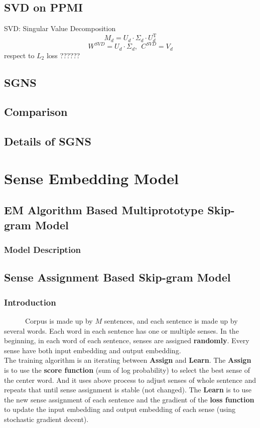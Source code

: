 \documentclass[12pt,a4paper,twoside]{book}
\begin{document}
\subsection{SVD on PPMI} 
SVD: Singular Value Decomposition \\
$$M_d = U_d\cdot\Sigma_d\cdot U_d^{\mathrm{T}}$$
$$W^{SVD} = U_d\cdot\Sigma_d, \ \ C^{SVD} = V_d$$
respect to $L_2$ loss ??????
\subsection{SGNS}
\subsection{Comparison}
\subsection{Details of SGNS}

\section{Sense Embedding Model}
\subsection{EM Algorithm Based Multiprototype Skip-gram Model}
\subsubsection{Model Description}
\subsection{Sense Assignment Based Skip-gram Model}
\subsubsection{Introduction}
\ \ \ \ \ \ Corpus is made up by $M$ sentences, and each sentence is made up by several words. Each word in each sentence has one or multiple senses. In the beginning, in each word of each sentence, senses are assigned \textbf{randomly}. Every sense have both input embedding and output embedding.\\

The training algorithm is an iterating between \textbf{Assign} and \textbf{Learn}. The \textbf{Assign} is to use the \textbf{score function} (sum of log probability) to select the best sense of the center word. And it uses above process to adjust senses of whole sentence and repeats that until sense assignment is stable (not changed). The \textbf{Learn} is to use the new sense assignment of each sentence and the gradient of the \textbf{loss function} to update the input embedding and output embedding of each sense (using stochastic gradient decent). 
\end{document}

